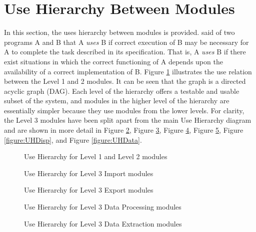 \documentclass[12pt, titlepage]{article}
\begin{document}
\section{Use Hierarchy Between Modules} \label{SecUse}

In this section, the uses hierarchy between modules is
provided. \cite{Parnas1978} said of two programs A and B that A {\em uses} B if
correct execution of B may be necessary for A to complete the task described in
its specification. That is, A {\em uses} B if there exist situations in which
the correct functioning of A depends upon the availability of a correct
implementation of B.  Figure \ref{figure:UH} illustrates the use relation
between
the Level 1 and 2 modules. It can be seen that the graph is a directed acyclic
graph
(DAG). Each level of the hierarchy offers a testable and usable subset of the
system, and modules in the higher level of the hierarchy are essentially simpler
because they use modules from the lower levels. For clarity, the Level 3 modules
have been split apart from the main Use Hierarchy diagram and are shown in more
detail in Figure \ref{figure:UHIm}, Figure \ref{figure:UHEx}, Figure
\ref{figure:UHDP}, Figure \ref{figure:UHDE}, Figure \ref{figure:UHDisp}, and
Figure \ref{figure:UHData}.

\begin{figure}[h!]
	\centering
	
	\caption{Use Hierarchy for Level 1 and Level 2 modules}
	\label{figure:UH}
\end{figure}

\begin{figure}[h!]
	\centering
	
	\caption{Use Hierarchy for Level 3 Import modules}
	\label{figure:UHIm}
\end{figure}

\begin{figure}[h!]
	\centering
	
	\caption{Use Hierarchy for Level 3 Export modules}
	\label{figure:UHEx}
\end{figure}

\begin{figure}[h!]
	\centering
	
	\caption{Use Hierarchy for Level 3 Data Processing modules}
	\label{figure:UHDP}
\end{figure}

\begin{figure}[h!]
	\centering
	
	\caption{Use Hierarchy for Level 3 Data Extraction modules}
	\label{figure:UHDE}
\end{figure}
\end{document}
